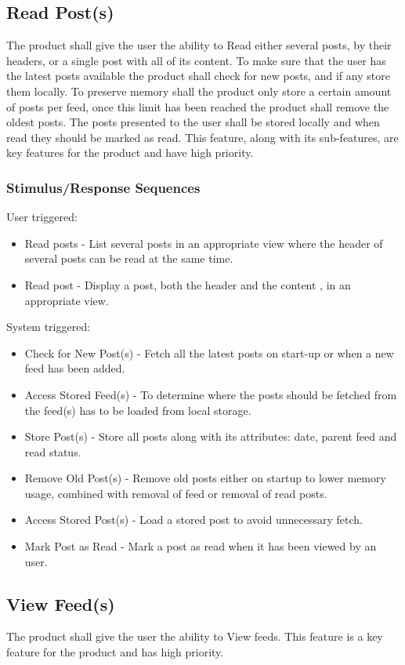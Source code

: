 \subsection{Read Post(s)}
The product shall give the user the ability to Read either several posts, by their headers, or a single post with all of its content. To make sure that the user has the latest posts available the product shall check for new posts, and if any store them locally. To preserve memory shall the product only store a certain amount of posts per feed, once this limit has been reached the product shall remove the oldest posts. The posts presented to the user shall be stored locally and when read they should be marked as read. This feature, along with its sub-features, are key features for the product and have high priority.


\subsubsection{Stimulus/Response Sequences}
User triggered:
\begin{itemize}
  \item Read posts - List several posts in an appropriate view where the header of several posts can be read at the same time.
  \item Read post - Display a post, both the header and the content , in an appropriate view.
\end{itemize}
System triggered:
\begin{itemize}
  \item Check for New Post(s) - Fetch all the latest posts on start-up or when a new feed has been added.
  \item Access Stored Feed(s) - To determine where the posts should be fetched from the feed(s) has to be loaded from local storage.
  \item Store Post(s) - Store all posts along with its attributes: date, parent feed and read status.
  \item Remove Old Post(s) - Remove old posts either on startup to lower memory usage, combined with removal of feed or removal of read posts.
  \item Access Stored Post(s) - Load a stored post to avoid unnecessary fetch.
  \item Mark Post as Read - Mark a post as read when it has been viewed by an user.
\end{itemize}


\subsection{View Feed(s)}
The product shall give the user the ability to View feeds. This feature is a key feature for the product and has high priority.


